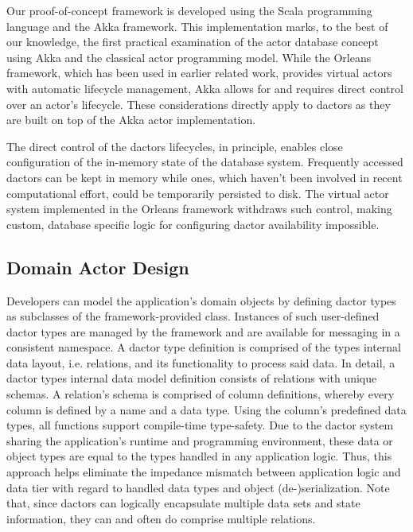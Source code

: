 Our proof-of-concept framework is developed using the Scala programming language and the Akka framework.
This implementation marks, to the best of our knowledge, the first practical examination of the actor database concept using Akka and the classical actor programming model.
While the Orleans framework, which has been used in earlier related work, provides virtual actors with automatic lifecycle management, Akka allows for and requires direct control over an actor's lifecycle.
These considerations directly apply to \glspl{dactor} as they are built on top of the Akka actor implementation.

The direct control of the \glspl{dactor} lifecycles, in principle, enables close configuration of the in-memory state of the database system.
Frequently accessed \glspl{dactor} can be kept in memory while ones, which haven't been involved in recent computational effort, could be temporarily persisted to disk.
The virtual actor system implemented in the Orleans framework withdraws such control, making custom, database specific logic for configuring \gls{dactor} availability impossible.

\subsection{Domain Actor Design}\label{subsec:domain_actor_design}

Developers can model the application's domain objects by defining \gls{dactor} types as subclasses of the framework-provided  class.
Instances of such user-defined \gls{dactor} types are managed by the framework and are available for messaging in a consistent namespace.
A \gls{dactor} type definition is comprised of the types internal data layout, i.e. \glspl{relation}, and its functionality to process said data.
In detail, a \gls{dactor} types internal data model definition consists of \glspl{relation} with unique schemas.
A \gls{relation}'s schema is comprised of column definitions, whereby every column is defined by a name and a data type.
Using the column's predefined data types, all functions support compile-time type-safety.
Due to the \gls{dactor} system sharing the application's runtime and programming environment, these data or object types are equal to the types handled in any application logic.
Thus, this approach helps eliminate the impedance mismatch between application logic and data tier with regard to handled data types and object (de-)serialization.
Note that, since \glspl{dactor} can logically encapsulate multiple data sets and state information, they can and often do comprise multiple \glspl{relation}.

